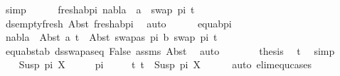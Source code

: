 \begin{isabellebody}
\ simp\isanewline
\isanewline
\ \ \ \ \isamarkupfalse%
\ fresh{\isacharunderscore}{\kern0pt}ab{\isacharunderscore}{\kern0pt}pi{}{\isacharcolon}{\kern0pt}\ {\isachardoublequoteopen}nabla\ {\isasymturnstile}\ a\ {\isasymsharp}\ swap\ pi{}\ t{}{\isacharprime}{\kern0pt}{\isachardoublequoteclose}\isanewline
\ \ \ \ \ \ \isamarkupfalse%
\ ds{\isacharunderscore}{\kern0pt}empty{\isacharunderscore}{\kern0pt}fresh{\isacharunderscore}{\kern0pt}{}\ Abst{\isacharparenleft}{\kern0pt}{}{\isacharparenright}{\kern0pt}\ fresh{\isacharunderscore}{\kern0pt}ab{\isacharunderscore}{\kern0pt}pi{}\ \isamarkupfalse%
\ auto\isanewline
\ \ \ \ \isamarkupfalse%
\ equ{\isacharunderscore}{\kern0pt}ab{\isacharunderscore}{\kern0pt}pi{}\ \isamarkupfalse%
\ {\isachardoublequoteopen}nabla\ {\isasymturnstile}\ Abst\ a\ t{}{\isacharprime}{\kern0pt}\ {\isasymapprox}\ Abst\ {\isacharparenleft}{\kern0pt}swapas\ pi{}\ b{\isacharparenright}{\kern0pt}\ {\isacharparenleft}{\kern0pt}swap\ pi{}\ t{}{\isacharprime}{\kern0pt}{\isacharparenright}{\kern0pt}{\isachardoublequoteclose}\isanewline
\ \ \ \ \ \ \isamarkupfalse%
\ equ{\isacharunderscore}{\kern0pt}abst{\isacharunderscore}{\kern0pt}ab\ ds{\isacharunderscore}{\kern0pt}swapas{\isacharunderscore}{\kern0pt}eq\ False\ assms\ Abst{\isacharparenleft}{\kern0pt}{}{\isacharparenright}{\kern0pt}\ \isamarkupfalse%
\ auto\isanewline
\ \ \ \ \isamarkupfalse%
\ \isamarkupfalse%
\ {\isacharquery}{\kern0pt}thesis\ \isamarkupfalse%
\ t{}\ \isamarkupfalse%
\ simp\isanewline
\ \ \isamarkupfalse%
\isanewline
{}\isamarkupfalse%
\isanewline
\ \ \isamarkupfalse%
\ {\isacharparenleft}{\kern0pt}Susp\ pi{\isacharprime}{\kern0pt}\ X{\isacharparenright}{\kern0pt}\isanewline
\ \ \isamarkupfalse%
\ \isamarkupfalse%
\ pi\isanewline
\ \ \ \ \ t{}{\isacharcolon}{\kern0pt}\ {\isachardoublequoteopen}t{}\ {\isacharequal}{\kern0pt}\ Susp\ pi\ X{\isachardoublequoteclose}\isanewline
\ \ \ \ \isamarkupfalse%
\ {\isacharparenleft}{\kern0pt}auto\ elim{\isacharcolon}{\kern0pt}equ{\isachardot}{\kern0pt}cases{\isacharparenright}{\kern0pt}\isanewline
\ \ \isamarkupfalse%

\end{isabellebody}
